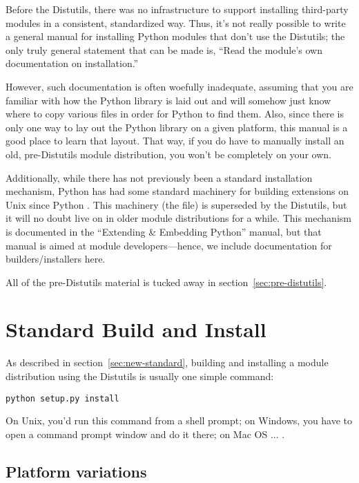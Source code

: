 \documentclass{howto}
\begin{document}
Before the Distutils, there was no infrastructure to support installing
third-party modules in a consistent, standardized way.  Thus, it's not
really possible to write a general manual for installing Python modules
that don't use the Distutils; the only truly general statement that can
be made is, ``Read the module's own documentation on installation.''

However, such documentation is often woefully inadequate, assuming that
you are familiar with how the Python library is laid out and will
somehow just know where to copy various files in order for Python to
find them.  Also, since there is only one way to lay out the Python
library on a given platform, this manual is a good place to learn that
layout.  That way, if you do have to manually install an old,
pre-Distutils module distribution, you won't be completely on your own.

Additionally, while there has not previously been a standard
installation mechanism, Python has had some standard machinery for
building extensions on Unix since Python .  This machinery
(the  file) is superseded by the Distutils, but it
will no doubt live on in older module distributions for a while.  This
 mechanism is documented in the ``Extending \&
Embedding Python'' manual, but that manual is aimed at module
developers---hence, we include documentation for builders/installers
here.

All of the pre-Distutils material is tucked away in
section~\ref{sec:pre-distutils}.


\section{Standard Build and Install}
\label{sec:normal-install}

As described in section~\ref{sec:new-standard}, building and installing
a module distribution using the Distutils is usually one simple command:
\begin{verbatim}
python setup.py install
\end{verbatim}
On Unix, you'd run this command from a shell prompt; on Windows, you
have to open a command prompt window and do it there; on Mac OS ...
.


\subsection{Platform variations}
\end{document}
